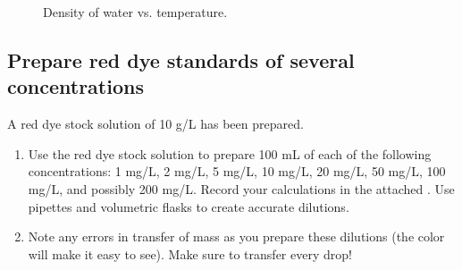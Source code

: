 \documentclass[letterpaper,10pt,english]{sphinxmanual}
\let\sphinxpxdimen\pdfpxdimen\else\newdimen\sphinxpxdimen
\begin{document}
\begin{figure}[htbp]
\centering
\capstart

\noindent\sphinxincludegraphics[width=300\sphinxpxdimen]{{Density_vs_T}.png}
\caption{Density of water vs. temperature.}\label{\detokenize{Laboratory_Measurements/Laboratory_Measurements:id5}}\label{\detokenize{Laboratory_Measurements/Laboratory_Measurements:figure-density-vs-t}}\end{figure}


\subsection{Prepare red dye standards of several concentrations}
\label{\detokenize{Laboratory_Measurements/Laboratory_Measurements:prepare-red-dye-standards-of-several-concentrations}}
A red dye stock solution of 10 g/L has been prepared.
\begin{enumerate}
\item {} 
Use the red dye stock solution to prepare 100 mL of each of the following concentrations: 1 mg/L, 2 mg/L, 5 mg/L, 10 mg/L, 20 mg/L, 50 mg/L, 100 mg/L, and possibly 200 mg/L.  Record your calculations in the attached . Use pipettes and volumetric flasks to create accurate dilutions.

\item {} 
Note any errors in transfer of mass as you prepare these dilutions (the color will make it easy to see). Make sure to transfer every drop!

\end{enumerate}
\end{document}
